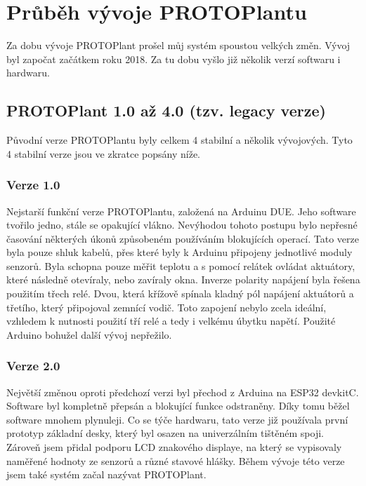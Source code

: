 \chapter{Průběh vývoje PROTOPlantu}
Za dobu vývoje PROTOPlant prošel můj systém spoustou velkých změn.
Vývoj byl započat začátkem roku 2018.
Za tu dobu vyšlo již několik verzí softwaru i hardwaru.

\section{PROTOPlant 1.0 až 4.0 (tzv. legacy verze)}
Původní verze PROTOPlantu byly celkem 4 stabilní a několik vývojových.
Tyto 4 stabilní verze jsou ve zkratce popsány níže.

\subsection{Verze 1.0}
Nejstarší funkční verze PROTOPlantu, založená na Arduinu DUE. 
Jeho software tvořilo jedno, stále se opakující vlákno.
Nevýhodou tohoto postupu bylo nepřesné časování některých úkonů způsobeném používáním blokujících operací.
Tato verze byla pouze shluk kabelů, přes které byly k Arduinu připojeny jednotlivé moduly senzorů.
Byla schopna pouze měřit teplotu a s pomocí relátek ovládat aktuátory, které následně otevíraly, nebo zavíraly okna.
Inverze polarity napájení byla řešena použitím třech relé.
Dvou, která křížově spínala kladný pól napájení aktuátorů a třetího, který připojoval zemnící vodič.
Toto zapojení nebylo zcela ideální, vzhledem k nutnosti použití tří relé a tedy i velkému úbytku napětí.
Použité Arduino bohužel další vývoj nepřežilo.

\subsection{Verze 2.0}
Největší změnou oproti předchozí verzi byl přechod z Arduina na ESP32 devkitC.
Software byl kompletně přepsán a blokující funkce odstraněny.
Díky tomu běžel software mnohem plynuleji.
Co se týče hardwaru, tato verze již používala první prototyp základní desky, který byl osazen na univerzálním tištěném spoji.
Zároveň jsem přidal podporu LCD znakového displaye, na který se vypisovaly naměřené hodnoty ze senzorů a různé stavové hlášky.
Během vývoje této verze jsem také systém začal nazývat PROTOPlant.

